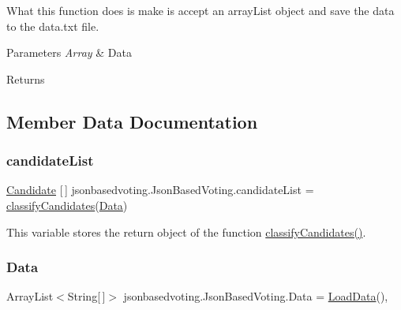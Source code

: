 What this function does is make is accept an array\+List object and save the data to the data.\+txt file. 
\begin{DoxyParams}{Parameters}
{\em Array} & Data \\
\hline
\end{DoxyParams}
\begin{DoxyReturn}{Returns}

\end{DoxyReturn}


\subsection{Member Data Documentation}
\mbox{\label{classjsonbasedvoting_1_1_json_based_voting_aeb1c0154551e24a6fe24fc6b71576924}} 
\subsubsection{\texorpdfstring{candidateList}{candidateList}}
{\footnotesize\ttfamily \mbox{\hyperlink{classjsonbasedvoting_1_1_candidate}{Candidate}} \mbox{[}$\,$\mbox{]} jsonbasedvoting.\+Json\+Based\+Voting.\+candidate\+List = \mbox{\hyperlink{classjsonbasedvoting_1_1_json_based_voting_a09a09c0673c510a648d225136e4cf259}{classify\+Candidates}}(\mbox{\hyperlink{classjsonbasedvoting_1_1_json_based_voting_a2450ce5604c5512836d2739373c6245e}{Data}})\hspace{0.3cm}{\ttfamily [static]}}

This variable stores the return object of the function \mbox{\hyperlink{classjsonbasedvoting_1_1_json_based_voting_a09a09c0673c510a648d225136e4cf259}{classify\+Candidates()}}. \mbox{\label{classjsonbasedvoting_1_1_json_based_voting_a2450ce5604c5512836d2739373c6245e}} 
\subsubsection{\texorpdfstring{Data}{Data}}
{\footnotesize\ttfamily Array\+List$<$String\mbox{[}$\,$\mbox{]}$>$ jsonbasedvoting.\+Json\+Based\+Voting.\+Data = \mbox{\hyperlink{classjsonbasedvoting_1_1_json_based_voting_adbcb2c2a084932df90996c7199251579}{Load\+Data}}()\hspace{0.3cm}{\ttfamily [static]}, {\ttfamily [package]}}

